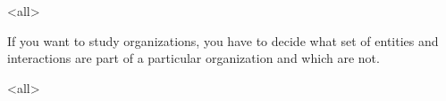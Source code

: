 \mode<all>{
}

If you want to study organizations, you have to decide what set of
entities and interactions are part of a particular organization and
which are not.

\mode<all>{
}


